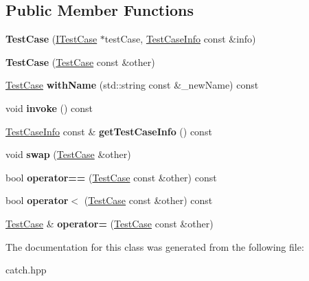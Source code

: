 \subsection*{Public Member Functions}
\begin{DoxyCompactItemize}
\item 
\hypertarget{classCatch_1_1TestCase_a03a5b913484681bd6d398dc5e9c2a907}{
{\bfseries TestCase} (\hyperlink{structCatch_1_1ITestCase}{ITestCase} $\ast$testCase, \hyperlink{structCatch_1_1TestCaseInfo}{TestCaseInfo} const \&info)}
\label{classCatch_1_1TestCase_a03a5b913484681bd6d398dc5e9c2a907}

\item 
\hypertarget{classCatch_1_1TestCase_ac0011d3789edc3e44edb41f13c4775a0}{
{\bfseries TestCase} (\hyperlink{classCatch_1_1TestCase}{TestCase} const \&other)}
\label{classCatch_1_1TestCase_ac0011d3789edc3e44edb41f13c4775a0}

\item 
\hypertarget{classCatch_1_1TestCase_ab6dbc6c82b7c1680013c67bdedccfc8e}{
\hyperlink{classCatch_1_1TestCase}{TestCase} {\bfseries withName} (std::string const \&\_\-newName) const }
\label{classCatch_1_1TestCase_ab6dbc6c82b7c1680013c67bdedccfc8e}

\item 
\hypertarget{classCatch_1_1TestCase_aac2e028135cc88c3e3aac04650960a6c}{
void {\bfseries invoke} () const }
\label{classCatch_1_1TestCase_aac2e028135cc88c3e3aac04650960a6c}

\item 
\hypertarget{classCatch_1_1TestCase_a25c03661ab092431cdff10df5c58a5a7}{
\hyperlink{structCatch_1_1TestCaseInfo}{TestCaseInfo} const \& {\bfseries getTestCaseInfo} () const }
\label{classCatch_1_1TestCase_a25c03661ab092431cdff10df5c58a5a7}

\item 
\hypertarget{classCatch_1_1TestCase_aee38f908faf10b905b209ca388275413}{
void {\bfseries swap} (\hyperlink{classCatch_1_1TestCase}{TestCase} \&other)}
\label{classCatch_1_1TestCase_aee38f908faf10b905b209ca388275413}

\item 
\hypertarget{classCatch_1_1TestCase_a40eab521b316c7d476f6b4dd1c33eec8}{
bool {\bfseries operator==} (\hyperlink{classCatch_1_1TestCase}{TestCase} const \&other) const }
\label{classCatch_1_1TestCase_a40eab521b316c7d476f6b4dd1c33eec8}

\item 
\hypertarget{classCatch_1_1TestCase_aa5174e85e3aac6e7398dee9c76730324}{
bool {\bfseries operator$<$} (\hyperlink{classCatch_1_1TestCase}{TestCase} const \&other) const }
\label{classCatch_1_1TestCase_aa5174e85e3aac6e7398dee9c76730324}

\item 
\hypertarget{classCatch_1_1TestCase_a8022e3f74232f7887d2d2cbbc8876502}{
\hyperlink{classCatch_1_1TestCase}{TestCase} \& {\bfseries operator=} (\hyperlink{classCatch_1_1TestCase}{TestCase} const \&other)}
\label{classCatch_1_1TestCase_a8022e3f74232f7887d2d2cbbc8876502}

\end{DoxyCompactItemize}


The documentation for this class was generated from the following file:\begin{DoxyCompactItemize}
\item 
catch.hpp\end{DoxyCompactItemize}
